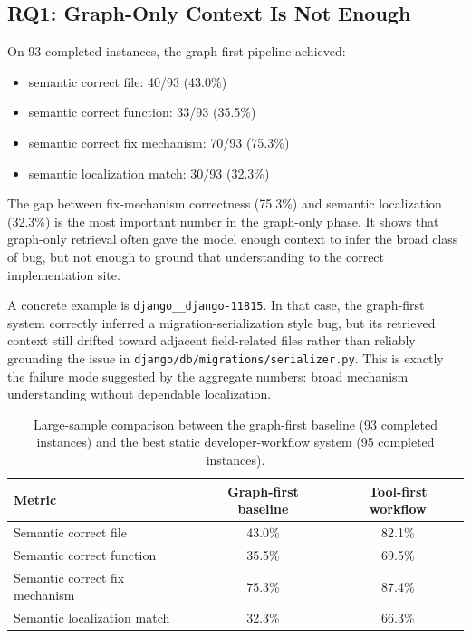 \documentclass[11pt]{article}
\begin{document}
\subsection{RQ1: Graph-Only Context Is Not Enough}

On 93 completed instances, the graph-first pipeline achieved:

\begin{itemize}
\item semantic correct file: 40/93 (43.0\%)
\item semantic correct function: 33/93 (35.5\%)
\item semantic correct fix mechanism: 70/93 (75.3\%)
\item semantic localization match: 30/93 (32.3\%)
\end{itemize}

The gap between fix-mechanism correctness (75.3\%) and semantic localization (32.3\%) is the most important number in the graph-only phase. It shows that graph-only retrieval often gave the model enough context to infer the broad class of bug, but not enough to ground that understanding to the correct implementation site.

A concrete example is \texttt{django\_\_django-11815}. In that case, the graph-first system correctly inferred a migration-serialization style bug, but its retrieved context still drifted toward adjacent field-related files rather than reliably grounding the issue in \texttt{django/db/migrations/serializer.py}. This is exactly the failure mode suggested by the aggregate numbers: broad mechanism understanding without dependable localization.

\begin{table}[t]
\centering
\begin{tabular}{lcc}
\toprule
Metric & Graph-first baseline & Tool-first workflow \\
\midrule
Semantic correct file & 43.0\% & 82.1\% \\
Semantic correct function & 35.5\% & 69.5\% \\
Semantic correct fix mechanism & 75.3\% & 87.4\% \\
Semantic localization match & 32.3\% & 66.3\% \\
\bottomrule
\end{tabular}
\caption{Large-sample comparison between the graph-first baseline (93 completed instances) and the best static developer-workflow system (95 completed instances).}
\label{tab:main-comparison}
\end{table}
\end{document}

